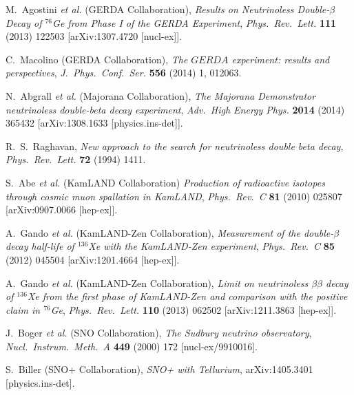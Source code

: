 \documentclass{PoS}
\begin{document}
\begin{thebibliography}{99}
   M.~Agostini {\it et al.} (GERDA Collaboration),
   \emph{Results on Neutrinoless Double-$\beta$ Decay of $^{76}$Ge from Phase I of the GERDA Experiment},
   \emph{Phys.\ Rev.\ Lett.} {\bf 111} (2013) 122503
   [arXiv:1307.4720 [nucl-ex]].

   C.~Macolino (GERDA Collaboration),
   \emph{The $GERDA$ experiment: results and perspectives},
   \emph{J.\ Phys.\ Conf.\ Ser.} {\bf 556} (2014) 1,  012063.

   N.~Abgrall {\it et al.} (Majorana Collaboration),
   \emph{The Majorana Demonstrator neutrinoless double-beta decay experiment},
   \emph{Adv.\ High Energy Phys.} {\bf 2014} (2014) 365432
   [arXiv:1308.1633 [physics.ins-det]].

   R.~S.~Raghavan,
   \emph{New approach to the search for neutrinoless double beta decay},
   \emph{Phys.\ Rev.\ Lett.} {\bf 72} (1994) 1411.

   S.~Abe {\it et al.} (KamLAND Collaboration)
   \emph{Production of radioactive isotopes through cosmic muon spallation in KamLAND},
   \emph{Phys.\ Rev.\ C} {\bf 81} (2010) 025807
   [arXiv:0907.0066 [hep-ex]].

   A.~Gando {\it et al.} (KamLAND-Zen Collaboration),
   \emph{Measurement of the double-$\beta$ decay half-life of $^{136}$Xe with the KamLAND-Zen experiment},
   \emph{Phys.\ Rev.\ C} {\bf 85} (2012) 045504
   [arXiv:1201.4664 [hep-ex]].

   A.~Gando {\it et al.} (KamLAND-Zen Collaboration),
   \emph{Limit on neutrinoless $\beta\beta$ decay of $^{136}$Xe from the first phase of KamLAND-Zen and comparison with the positive claim in $^{76}$Ge},
   \emph{Phys.\ Rev.\ Lett.}  {\bf 110} (2013) 062502
   [arXiv:1211.3863 [hep-ex]].

   J.~Boger {\it et al.} (SNO Collaboration),
   \emph{The Sudbury neutrino observatory},
   \emph{Nucl.\ Instrum.\ Meth.\ A} {\bf 449} (2000) 172
   [nucl-ex/9910016].

   S.~Biller (SNO+ Collaboration),
   \emph{SNO+ with Tellurium},
   arXiv:1405.3401 [physics.ins-det].


\end{thebibliography}
\end{document}
